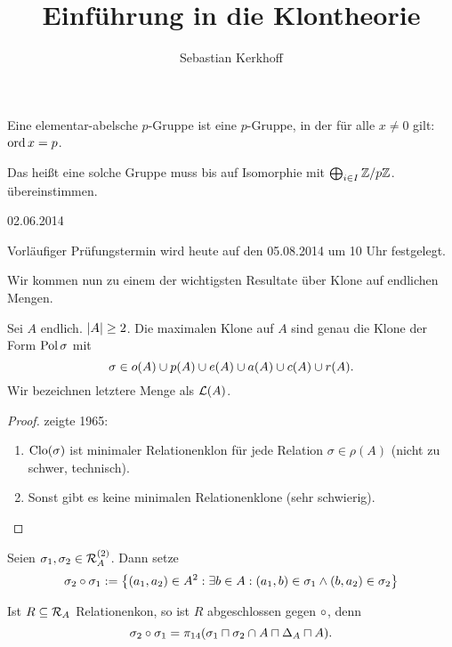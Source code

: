\documentclass{book}
\begin{document}
\title{Einführung in die Klontheorie}
\author{Sebastian Kerkhoff}
\pagestyle{empty}
\maketitle
\clearpage

\begin{definition}\label{elem-ab-p-group}
    Eine elementar-abelsche $p$-Gruppe ist eine $p$-Gruppe, in der für alle $x\neq 0$ gilt:
    $\mathop\mathrm{ord} x = p$.
\end{definition}

\begin{remark}
    Das heißt eine solche Gruppe muss bis auf Isomorphie mit $\bigoplus_{i\in I}{\mathbb{Z}/p\mathbb{Z}}$. übereinstimmen.
\end{remark}

\hfill{02.06.2014}

Vorläufiger Prüfungstermin wird heute auf den 05.08.2014 um 10 Uhr festgelegt.

Wir kommen nun zu einem der wichtigsten Resultate über Klone auf endlichen Mengen.

\begin{theorem}
    Sei $A$ endlich. $\left|A\right|\geq 2$. Die maximalen Klone auf $A$ sind genau die Klone der Form $\mathop\mathrm{Pol}\sigma$ mit
    $$
    \sigma\in o(A)\cup p(A)\cup e(A)\cup a(A)\cup c(A)\cup r(A).
    $$
    Wir bezeichnen letztere Menge als $\mathcal{L}(A)$.
\end{theorem}

\begin{proof}
     zeigte 1965:
    \begin{enumerate}
            \item $\mathrm{Clo}(\sigma)$ ist minimaler Relationenklon für jede Relation $\sigma\in\rho(A)$ (nicht zu schwer, technisch).
            \item Sonst gibt es keine minimalen Relationenklone (sehr schwierig).
    \end{enumerate}
\end{proof}

\begin{definition}
    Seien $\sigma_1,\sigma_2\in \mathcal{R}_A^{(2)}$. Dann setze
    $$
    \sigma_2\circ\sigma_1:=\left\{(a_1,a_2)\in A^2:\exists b\in A:(a_1,b)\in\sigma_1\wedge (b,a_2)\in\sigma_2\right\}
    $$
\end{definition}

\begin{remark}
    Ist $R\subseteq \mathcal{R}_A$ Relationenkon, so ist $R$ abgeschlossen gegen $\circ$, denn
    $$
    \sigma_2\compose\sigma_1=\pi_{14}(\sigma_1\settimes\sigma_2\setmeet A\settimes \Delta_A\settimes A).
    $$
\end{remark}
\end{document}
